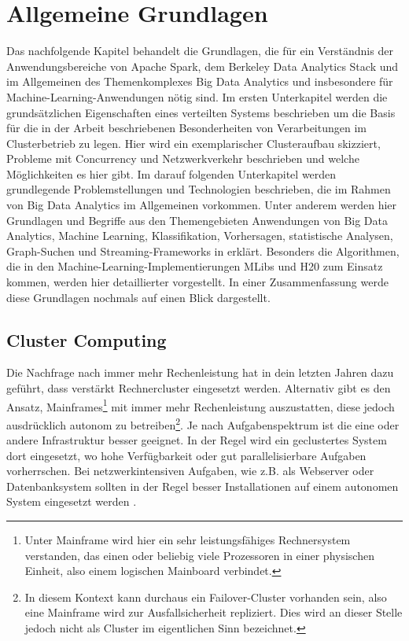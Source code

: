 \chapter{Allgemeine Grundlagen }
\label{chapter:allgemeine Grundlagen}


Das nachfolgende Kapitel behandelt die Grundlagen, die für ein Verständnis der Anwendungsbereiche von Apache Spark, dem Berkeley Data Analytics Stack und im Allgemeinen des Themenkomplexes Big Data Analytics und insbesondere für Machine-Learning-Anwendungen nötig sind. Im ersten Unterkapitel werden die grundsätzlichen Eigenschaften eines verteilten Systems beschrieben um die Basis für die in der Arbeit beschriebenen Besonderheiten von Verarbeitungen im Clusterbetrieb zu legen. Hier wird ein exemplarischer Clusteraufbau skizziert, Probleme mit Concurrency und Netzwerkverkehr beschrieben und welche Möglichkeiten es hier gibt.  Im darauf folgenden Unterkapitel werden grundlegende Problemstellungen und Technologien beschrieben, die im Rahmen von Big Data Analytics im Allgemeinen vorkommen. Unter anderem werden hier Grundlagen und Begriffe aus den Themengebieten Anwendungen von Big Data Analytics, Machine Learning, Klassifikation, Vorhersagen, statistische Analysen, Graph-Suchen und Streaming-Frameworks in erklärt. Besonders die Algorithmen, die in den Machine-Learning-Implementierungen MLibs und H20 zum Einsatz kommen, werden hier detaillierter vorgestellt. In einer Zusammenfassung werde diese Grundlagen nochmals auf einen Blick dargestellt. 
 

\section{Cluster Computing}
\label{section:cluster computing}

Die Nachfrage nach immer mehr Rechenleistung hat in dein letzten Jahren dazu geführt, dass verstärkt Rechnercluster eingesetzt werden. Alternativ gibt es den Ansatz, Mainframes\footnote{Unter Mainframe wird hier ein sehr leistungsfähiges Rechnersystem verstanden, das einen oder  beliebig viele Prozessoren in einer physischen Einheit, also einem logischen Mainboard verbindet. } mit immer mehr Rechenleistung auszustatten, diese jedoch ausdrücklich autonom zu betreiben\footnote{In diesem Kontext kann durchaus ein Failover-Cluster vorhanden sein, also eine Mainframe wird zur Ausfallsicherheit repliziert. Dies wird an dieser Stelle jedoch nicht als Cluster im eigentlichen Sinn bezeichnet.}. Je nach Aufgabenspektrum ist die eine oder andere Infrastruktur besser geeignet. In der Regel wird ein geclustertes System dort eingesetzt, wo hohe Verfügbarkeit oder gut parallelisierbare Aufgaben vorherrschen. Bei netzwerkintensiven Aufgaben, wie z.B. als Webserver oder Datenbanksystem sollten in der Regel besser Installationen auf einem autonomen System eingesetzt werden .   

